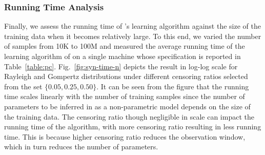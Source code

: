 \subsubsection{Running Time Analysis}    
Finally, we assess the running time of \npglm's learning algorithm against the size of the training data when it becomes relatively large. To this end, we varied the number of samples from 10K to 100M and measured the average running time of the learning algorithm of \npglm on a single machine whose specification is reported in Table~\ref{table:pc}. Fig.~\ref*{fig:syn-time-n} depicts the result in log-log scale for Rayleigh and Gompertz distributions under different censoring ratios selected from the set $\{0.05, 0.25, 0.50\}$. It can be seen from the figure that the running time scales linearly with the number of training samples since the number of parameters to be inferred in \npglm as a non-parametric model depends on the size of the training data. The censoring ratio though negligible in scale can impact the running time of the algorithm, with more censoring ratio resulting in less running time. This is because higher censoring ratio reduces the observation window, which in turn reduces the number of parameters.




